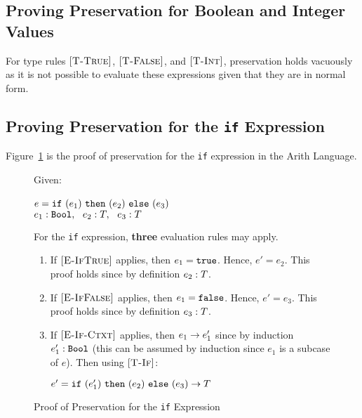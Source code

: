 \documentclass{report}
\newcommand{\rel}[1]{\mbox{\sc [#1]}}
\begin{document}
\subsection{Proving Preservation for Boolean and Integer Values}

For type rules $\rel{T-True}$, $\rel{T-False}$, and $\rel{T-Int}$, preservation holds vacuously as it is not possible to evaluate these expressions given that they are in normal form.

\subsection{Proving Preservation for the \texttt{if} Expression}

Figure~\ref{fig:ifProofPreservation} is the proof of preservation for the \texttt{if} expression in the Arith Language.

\begin{figure}[ht!]
Given:
\begin{center}
   $e = \mbox{\tt if}~({e_1})~\mbox{\tt then}~({e_2})~\mbox{\tt else}~({e_3})$~\\
   ${e_1} : {\mbox{\tt Bool}},~~{e_2} : {T},~~{e_3} : {T}$
\end{center}
For the \texttt{if} expression, \textbf{three} evaluation rules may apply.
\begin{enumerate}

    \item If $\rel{E-IfTrue}$ applies, then $e_1 = \mbox{\tt true}$.  Hence, $e' = e_2$.  This proof holds since by definition ${e_2} : {T}$.
      
    \item If $\rel{E-IfFalse}$ applies, then $e_1 = \mbox{\tt false}$.  Hence, $e' = e_3$.  This proof holds since by definition ${e_3} : {T}$.
    
    \item If $\rel{E-If-Ctxt}$ applies, then ${e_1} \rightarrow {e'_1}$ since by induction ${e'_1} : {\mbox{\tt Bool}}$ (this can be assumed by induction since $e_1$ is a subcase of $e$).  Then using $\rel{T-If}$:
    
    \begin{center}
      ${e' = \mbox{\tt if}~({e'_1})~\mbox{\tt then}~({e_2})~\mbox{\tt else}~({e_3})} \rightarrow {T}$
    \end{center}
	
	\end{enumerate}
	
  \caption{Proof of Preservation for the \texttt{if} Expression}\label{fig:ifProofPreservation}
\end{figure} 
\end{document}

